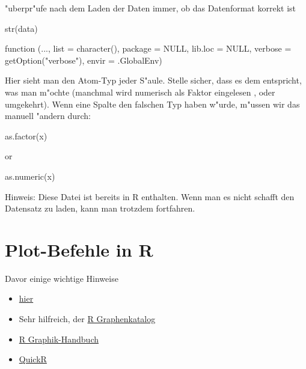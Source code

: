 \documentclass[a4paper,twoside]{tufte-book}\usepackage[]{graphicx}\usepackage[]{color}
\begin{document}
\begin{appendices}
"uberpr"ufe nach dem Laden der Daten immer, ob das Datenformat korrekt ist

\begin{Schunk}
\begin{Sinput}
str(data)
\end{Sinput}
\begin{Soutput}
function (..., list = character(), package = NULL, lib.loc = NULL, 
    verbose = getOption("verbose"), envir = .GlobalEnv)  
\end{Soutput}
\end{Schunk}

Hier sieht man den Atom-Typ jeder S"aule. Stelle sicher, dass es dem entspricht, was man m"ochte (manchmal wird numerisch als Faktor eingelesen , oder umgekehrt). Wenn eine Spalte den falschen Typ haben w"urde, m"ussen wir das manuell "andern durch:

\begin{Schunk}
\begin{Sinput}
as.factor(x)
\end{Sinput}
\end{Schunk}
or 
\begin{Schunk}
\begin{Sinput}
as.numeric(x)
\end{Sinput}
\end{Schunk}


Hinweis: Diese Datei ist bereits in R enthalten. Wenn man es nicht schafft den Datensatz zu laden, kann man trotzdem fortfahren.

\chapter{Plot-Befehle in R}

Davor einige wichtige Hinweise

\begin{itemize}
\item \href{http://rgraphgallery.blogspot.de/search/label/3%20vartiable%20plots}{hier}
\item Sehr hilfreich, der \href{http://shiny.stat.ubc.ca/r-graph-catalog/#}{R Graphenkatalog}
\item \href{http://rgm3.lab.nig.ac.jp/RGM/R_image_list?page=2282&init=true}{R Graphik-Handbuch}
\item \href{http://www.statmethods.net/graphs/line.html}{QuickR}
\end{itemize}




\end{appendices}
\end{document}
